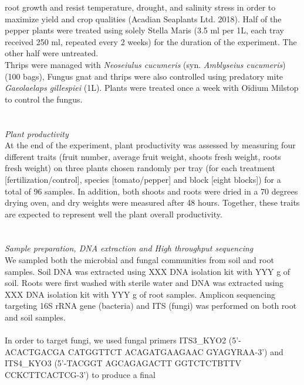 \documentclass[11pt,]{article}
\begin{document}
root growth and resist temperature, drought, and salinity stress in
order to maximize yield and crop qualities (Acadian Seaplants Ltd.
2018). Half of the pepper plants were treated using solely Stella Maris
(3.5 ml per 1L, each tray received 250 ml, repeated every 2 weeks) for
the duration of the experiment. The other half were untreated. ~\\
Thrips were managed with \emph{Neoseiulus cucumeris} (syn.
\emph{Amblyseius cucumeris}) (100 bags), Fungus gnat and thrips were
also controlled using predatory mite \emph{Gaeolaelaps gillespiei} (1L).
Plants were treated once a week with Oïdium Milstop to control the
fungus.\\
\hspace*{0.333em}\\
\hspace*{0.333em}\\
\emph{Plant productivity}\\
At the end of the experiment, plant productivity was assessed by
measuring four different traits (fruit number, average fruit weight,
shoots fresh weight, roots fresh weight) on three plants chosen randomly
per tray (for each treatment {[}fertilization/control{]}, species
{[}tomato/pepper{]} and block {[}eight blocks{]}) for a total of 96
samples. In addition, both shoots and roots were dried in a 70 degrees
drying oven, and dry weights were measured after 48 hours. Together,
these traits are expected to represent well the plant overall
productivity.\\
\hspace*{0.333em}\\
\hspace*{0.333em}\\
\emph{Sample preparation, DNA extraction and High throughput
sequencing}\\
We sampled both the microbial and fungal communities from soil and root
samples. Soil DNA was extracted using XXX DNA isolation kit with YYY g
of soil. Roots were first washed with sterile water and DNA was
extracted using XXX DNA isolation kit with YYY g of root samples.
Amplicon sequencing targeting 16S rRNA gene (bacteria) and ITS (fungi)
was performed on both root and soil samples.\\
\hspace*{0.333em}\\
In order to target fungi, we used fungal primers ITS3\_KYO2
(5'-ACACTGACGA CATGGTTCT ACAGATGAAGAAC GYAGYRAA-3') and ITS4\_KYO3
(5'-TACGGT AGCAGAGACTT GGTCTCTBTTV CCKCTTCACTCG-3') to produce a final
\end{document}
